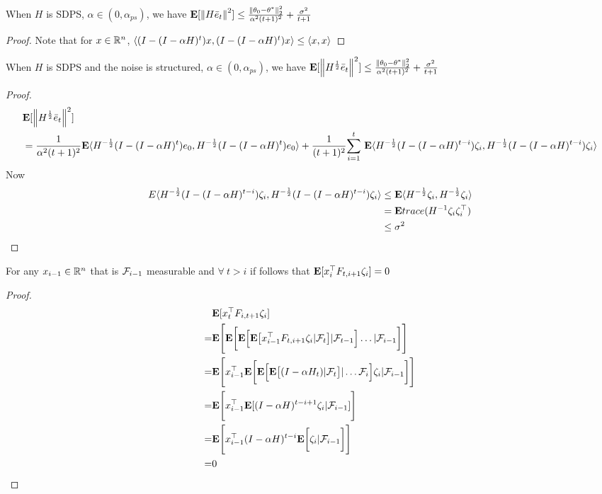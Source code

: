 \begin{theorem}
When $H$ is SDPS, $\alpha \in (0,\alpha_{ps})$, we have
$\E[\norm{H\eb_t}^2]\leq \frac{\norm{\theta_0-\ts}^2_2}{\alpha^2(t+1)^2}+\frac{\sigma^2}{t+1}$
\end{theorem}
\begin{proof}
Note that for $x\in \R^n$, $\ip{(I-(I-\alpha H)^t)x,(I-(I-\alpha H)^t)x}\leq \ip{x,x}$
\end{proof}

\begin{theorem}
When $H$ is SDPS and the noise is structured, $\alpha \in (0,\alpha_{ps})$, we have
$\E[\norm{H^{\frac{1}{2}}\eb_t}^2]\leq \frac{\norm{\theta_0-\ts}^2_2}{\alpha^2(t+1)^2}+\frac{\sigma^2}{t+1}$
\end{theorem}
\begin{proof}
\begin{align*}
&\E[\norm{H^{\frac{1}{2}}\eb_t}^2]\\
&=\frac{1}{\alpha^2(t+1)^2}\E\ip{H^{-\frac{1}{2}}(I-(I-\alpha H)^t)e_0,H^{-\frac{1}{2}}(I-(I-\alpha H)^t)e_0}+\frac{1}{(t+1)^2}\ous{\sum}{i=1}{t}\E\ip{H^{-\frac{1}{2}}(I-(I-\alpha H)^{t-i}) \zeta_i,H^{-\frac{1}{2}}(I-(I-\alpha H)^{t-i}) \zeta_i}
\end{align*}
Now
\begin{align*}
E\ip{H^{-\frac{1}{2}}(I-(I-\alpha H)^{t-i}) \zeta_i,H^{-\frac{1}{2}}(I-(I-\alpha H)^{t-i}) \zeta_i}&\leq \E\ip{H^{-\frac{1}{2}}\zeta_i,H^{-\frac{1}{2}}\zeta_i}\\
&=\E trace(H^{-1}\zeta_i\zeta_i^\top)\\
&\leq \sigma^2
\end{align*}

\end{proof}


\begin{lemma}
For any $x_{i-1}\in \R^n$ that is $\F_{i-1}$ measurable and $\forall ~t > i$ if follows that $\E[x_i^\top F_{t,i+1}\zeta_{i}]=0$
\end{lemma}
\small
\begin{proof}
\begin{align*}
&\E[x_t^\top F_{i,t+1}\zeta_{i}]\\
=&\E\Bigg[\E\bigg[\E\Big[\E\big[ x_{i-1}^\top F_{t,i+1}\zeta_{i}|\F_{t}\big]|\F_{t-1}\Big]\ldots|\F_{i-1}\bigg]\Bigg]\\
=&\E\Bigg[ x_{i-1}^\top \E\bigg[\E\Big[\E\big[(I-\alpha H_t)|\F_{t}\big]|\ldots \F_{i}\Big]\zeta_{i}|\F_{i-1}\bigg]\Bigg]\\
=&\E\Bigg[ x_{i-1}^\top \E[(I-\alpha H)^{t-i+1}\zeta_{i}|\F_{i-1}]\Bigg]\\
=&\E\Bigg[ x_{i-1}^\top (I-\alpha H)^{t-i}\E\bigg[\zeta_{i}|\F_{i-1}\bigg]\Bigg]\\
=&0
\end{align*}
\end{proof}

